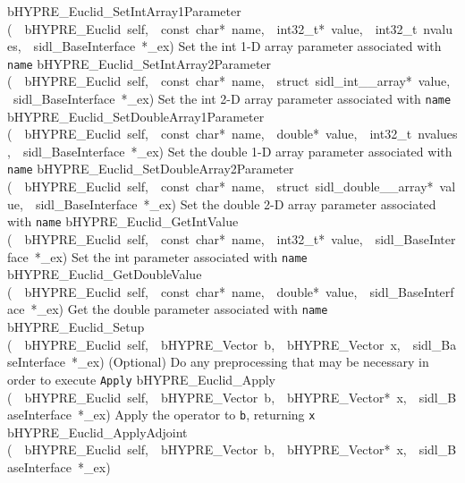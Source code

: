 \documentclass{article}
\begin{document}
\begin{cxxentry}
\begin{cxxentry}
\begin{cxxnames}
        {bHYPRE\_Euclid\_SetIntArray1Parameter}
        {(\ \ bHYPRE\_Euclid\ self,\ \ const\ char*\ name,\ \ int32\_t*\ value,\ \ int32\_t\ nvalues,\ \ sidl\_BaseInterface\ *\_ex)}
        {
Set the int 1-D array parameter associated with {\tt name}}
        {}
\label{cxx.6.3.21}
        {bHYPRE\_Euclid\_SetIntArray2Parameter}
        {(\ \ bHYPRE\_Euclid\ self,\ \ const\ char*\ name,\ \ struct\ sidl\_int\_\_array*\ value,\ \ sidl\_BaseInterface\ *\_ex)}
        {
Set the int 2-D array parameter associated with {\tt name}}
        {}
\label{cxx.6.3.22}
        {bHYPRE\_Euclid\_SetDoubleArray1Parameter}
        {(\ \ bHYPRE\_Euclid\ self,\ \ const\ char*\ name,\ \ double*\ value,\ \ int32\_t\ nvalues,\ \ sidl\_BaseInterface\ *\_ex)}
        {
Set the double 1-D array parameter associated with {\tt name}}
        {}
\label{cxx.6.3.23}
        {bHYPRE\_Euclid\_SetDoubleArray2Parameter}
        {(\ \ bHYPRE\_Euclid\ self,\ \ const\ char*\ name,\ \ struct\ sidl\_double\_\_array*\ value,\ \ sidl\_BaseInterface\ *\_ex)}
        {
Set the double 2-D array parameter associated with {\tt name}}
        {}
\label{cxx.6.3.24}
        {bHYPRE\_Euclid\_GetIntValue}
        {(\ \ bHYPRE\_Euclid\ self,\ \ const\ char*\ name,\ \ int32\_t*\ value,\ \ sidl\_BaseInterface\ *\_ex)}
        {
Set the int parameter associated with {\tt name}}
        {}
\label{cxx.6.3.25}
        {bHYPRE\_Euclid\_GetDoubleValue}
        {(\ \ bHYPRE\_Euclid\ self,\ \ const\ char*\ name,\ \ double*\ value,\ \ sidl\_BaseInterface\ *\_ex)}
        {
Get the double parameter associated with {\tt name}}
        {}
\label{cxx.6.3.26}
        {bHYPRE\_Euclid\_Setup}
        {(\ \ bHYPRE\_Euclid\ self,\ \ bHYPRE\_Vector\ b,\ \ bHYPRE\_Vector\ x,\ \ sidl\_BaseInterface\ *\_ex)}
        {
(Optional) Do any preprocessing that may be necessary in
order to execute {\tt Apply}}
        {}
\label{cxx.6.3.27}
        {bHYPRE\_Euclid\_Apply}
        {(\ \ bHYPRE\_Euclid\ self,\ \ bHYPRE\_Vector\ b,\ \ bHYPRE\_Vector*\ x,\ \ sidl\_BaseInterface\ *\_ex)}
        {
Apply the operator to {\tt b}, returning {\tt x}}
        {}
\label{cxx.6.3.28}
        {bHYPRE\_Euclid\_ApplyAdjoint}
        {(\ \ bHYPRE\_Euclid\ self,\ \ bHYPRE\_Vector\ b,\ \ bHYPRE\_Vector*\ x,\ \ sidl\_BaseInterface\ *\_ex)}

\end{cxxnames}
\end{cxxentry}
\end{cxxentry}
\end{document}
